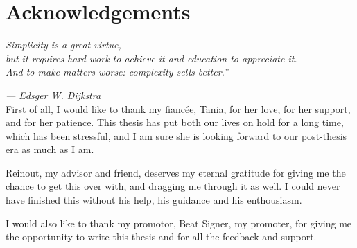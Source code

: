 
 \chapter*{Acknowledgements}

  \emph{Simplicity is a great virtue,\\
  but it requires hard work to achieve it and education to appreciate it.\\
  And to make matters worse: complexity sells better.''}

  \hfill\emph{--- Edsger W. Dijkstra}\\


  First of all, I would like to thank my fianc\'ee, Tania, for her love, for
  her support, and for her patience. This thesis has put both our lives on hold
  for a long time, which has been stressful, and I am sure she is looking
  forward to our post-thesis era as much as I am.


  Reinout, my advisor and friend, deserves my eternal gratitude for giving me
  the chance to get this over with, and dragging me through it as well. I
  could never have finished this without his help, his guidance and his
  enthousiasm.

  I would also like to thank my promotor, Beat Signer, my promoter, for giving
  me the opportunity to write this thesis and for all the feedback and support.


